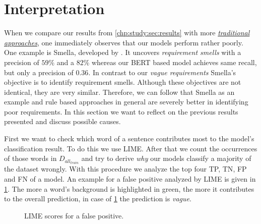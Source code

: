 \section{Interpretation}
\label{chp:study:sec:interpretation}

When we compare our results from \cref{chp:study:sec:results} with more \hyperref[chp:related_research:sec:rule_based approaches]{\textit{traditional approaches}}, one immediately observes that our models perform rather poorly.
One example is Smella, developed by \textcite{Femmer:2017}.
It uncovers \textit{requirement smells} with a precision of $59\%$ and a $82\%$ whereas our \ac{BERT} based model achieves same recall, but only a precision of $0.36$.
In contrast to our \textit{vague requirements} Smella's objective is to identify requirement smells.
Although these objectives are not identical, they are very similar.
Therefore, we can follow that Smella as an example and rule based approaches in general are severely better in identifying poor requirements.
In this section we want to reflect on the previous results presented and discuss possible causes.

First we want to check which word of a sentence contributes most to the model's classification result.
To do this we use \ac{LIME}.
After that we count the occurrences of those words in $D_{all_{train}}$ and try to derive \textit{why} our models classify a majority of the dataset wrongly.
With this procedure we analyze the top four \ac{TP}, \ac{TN}, \ac{FP} and \ac{FN} of a model.
An example for a false positive analyzed by \ac{LIME} is given in \cref{fig:study:interpretation:LIME}.
The more a word's background is highlighted in green, the more it contributes to the overall prediction, in case of \cref{fig:study:interpretation:LIME} the prediction is \textit{vague}.
\begin{figure}[htpb]
    \centering
    \def\svgwidth{\columnwidth}
    \scalebox{0.80}{}
    \caption[Study Interpretation: Example for LIME]{LIME scores for a false positive.}\label{fig:study:interpretation:LIME}
\end{figure}


